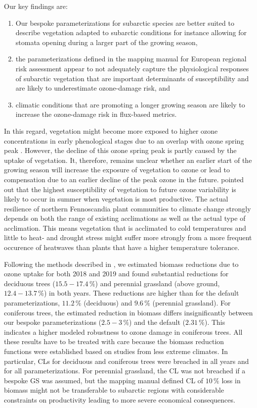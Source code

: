 \documentclass[bg, manuscript]{copernicus}
\begin{document}
Our key findings are: 
\begin{enumerate}
\item Our bespoke parameterizations for subarctic species are better suited to describe vegetation adapted to subarctic conditions for instance allowing for stomata opening during a larger part of the growing season, 
\item the parameterizations defined in the mapping manual for European regional risk assessment appear to not adequately capture the physiological responses of subarctic vegetation that are important determinants of \chem{[O_3]} susceptibility and are likely to underestimate ozone-damage risk, and 
\item climatic conditions that are promoting a longer growing season are likely to increase the ozone-damage risk in flux-based metrics.
\end{enumerate}

In this regard, vegetation might become more exposed to higher ozone concentrations in early phenological stages due to an overlap with ozone spring peak \citep{EP:Karlsson2007}. However, the decline of this ozone spring peak is partly caused by the uptake of vegetation. It, therefore, remains unclear whether an earlier start of the growing season will increase the exposure of vegetation to ozone or lead to compensation due to an earlier decline of the peak ozone in the future. \citet{ESPR:Hayes2021} pointed out that the highest susceptibility of vegetation to future ozone variability is likely to occur in summer when vegetation is most productive. The actual resilience of northern Fennoscandia plant communities to climate change strongly depends on both the range of existing acclimations as well as the actual type of acclimation. This means vegetation that is acclimated to cold temperatures and little to heat- and drought stress might suffer more strongly from a more frequent occurence of heatwaves than plants that have a higher temperature tolerance.

Following the methods described in \citet{ICP:MappingManual2017}, we estimated biomass reductions due to ozone uptake for both 2018 and 2019 and found substantial reductions for deciduous trees ($15.5-17.4\,\unit{\%}$) and perennial grassland (above ground, $12.4-13.7\,\unit{\%}$) in both years. These reductions are higher than for the default parameterizations, $11.2\,\unit{\%}$ (deciduous) and $9.6\,\unit{\%}$ (perennial grassland). For coniferous trees, the estimated reduction in biomass differs insignificantly between our bespoke parameterizations ($2.5-3\,\unit{\%}$) and the default ($2.31\,\unit{\%}$). This indicates a higher modeled robustness to ozone damage in coniferous trees. All these results have to be treated with care because the biomass reduction functions were established based on studies from less extreme climates. In particular, CLs for deciduous and coniferous trees were breached in all years and for all parameterizations. For perennial grassland, the CL was not breached if a bespoke GS was assumed, but the mapping manual defined CL of $10\,\unit{\%}$ loss in biomass might not be transferable to subarctic regions with considerable constraints on productivity leading to more severe economical consequences.
\end{document}
